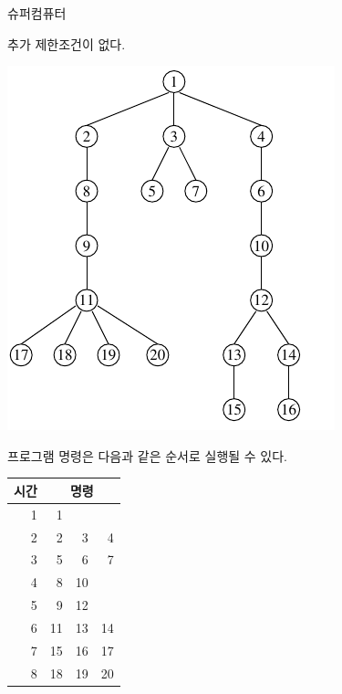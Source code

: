 \begin{problem}{슈퍼컴퓨터}
	
	추가 제한조건이 없다.
	
	\Examples
		
	\begin{example}
	\end{example}
	
	\Notes
	
	\begin{center}
		\includegraphics[]{sup.png}
	\end{center}
	
	프로그램 명령은 다음과 같은 순서로 실행될 수 있다.
	
	\begin{center}
	
	\begin{tabular}{|r|rrr|}
		\hline
		\multicolumn{1}{|c|}{\large \textbf{시간}}& \multicolumn{3}{c|}{\large \textbf{명령}} \\ \hline
		1&      1&       &       \\ 
		2&      2&      3&     4 \\ 
		3&      5&      6&     7 \\ 
		4&      8&     10&       \\ 
		5&      9&     12&       \\ 
		6&     11&     13&    14 \\ 
		7&     15&     16&    17 \\ 
		8&     18&     19&    20 \\ \cline{1-4}
	\end{tabular}
	\end{center}
	
\end{problem}

